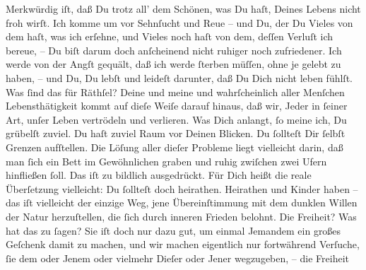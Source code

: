 \pstart
           Merkwürdig iſt, daß Du trotz all’ dem Schönen, was Du haſt, Deines Lebens nicht froh
               wirſt. Ich komme um vor Sehnſucht und Reue – und Du, der Du Vieles von dem haſt, was
               ich erſehne, und Vieles noch haſt von dem, deſſen Verluſt ich bereue, – Du biſt darum
               doch {\pb}anſcheinend nicht ruhiger noch zufriedener.
               Ich werde von der Angſt gequält, daß ich werde{ }ſterben müſſen, ohne je gelebt zu
               haben, – und Du, Du lebſt und leideſt darunter, daß Du Dich nicht leben fühlſt. Was{ }ſind das für Räthſel? Deine und meine und 
               wahrſcheinlich aller Menſchen Lebensthätigkeit kommt auf dieſe Weiſe darauf hinaus,
               daß wir, Jeder in{ }ſeiner Art, unſer Leben vertrödeln und verlieren. Was Dich anlangt,{ }ſo meine ich, Du grübelſt zuviel. Du haſt zuviel Raum vor Deinen Blicken. \strikeout{\textcolor{gray}{×}} Du{ }ſollteſt Dir{ }ſelbſt Grenzen aufſtellen. Die Löſung aller dieſer Probleme
                  {\pb}liegt vielleicht darin, daß man{ }ſich ein Bett im
               Gewöhnlichen graben und ruhig zwiſchen zwei Ufern hinfließen{ }ſoll. Das iſt zu
               bildlich ausgedrückt. Für Dich heißt die reale Überſetzung vielleicht: Du{ }ſollteſt
               doch heirathen. Heirathen und Kinder haben – das iſt vielleicht der einzige Weg, jene
               Übereinſtimmung mit dem dunklen Willen der Natur herzuſtellen, die{ }ſich durch inneren
               Frieden belohnt. Die Freiheit? Was hat das zu{ }ſagen? Sie iſt doch nur dazu gut, um
                  {\pb}\strikeout{\textcolor{gray}{e}} einmal Jemandem ein großes Geſchenk damit zu machen, und wir machen  eigentlich nur fortwährend Verſuche,{ }ſie dem oder
               Jenem oder vielmehr Dieſer oder Jener  wegzugeben, –
               die Freiheit{\dotssix}\pend
           
